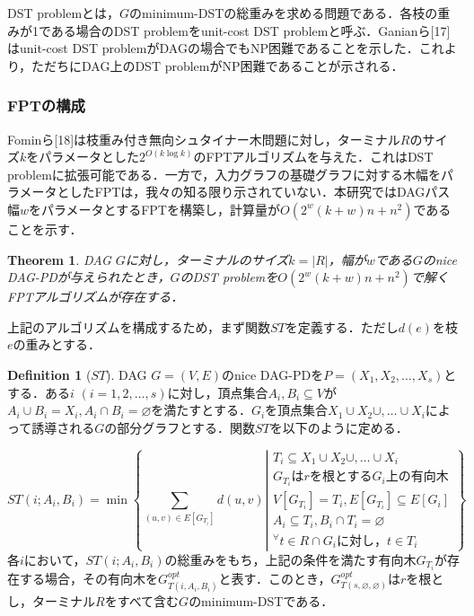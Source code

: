 \documentclass[master]{kuisthesis}		%
\theoremstyle{plain}
\newtheorem{theorem}{Theorem}
\theoremstyle{definition}
\newtheorem{definition*}{Definition}
\begin{document}
DST problemとは，$G$のminimum-DSTの総重みを求める問題である．各枝の重みが1である場合のDST problemをunit-cost DST problemと呼ぶ．Ganianら[17]はunit-cost DST problemがDAGの場合でもNP困難であることを示した．これより，ただちにDAG上のDST problemがNP困難であることが示される．

\subsubsection{FPTの構成}
Fominら[18]は枝重み付き無向シュタイナー木問題に対し，ターミナル$R$のサイズ$k$をパラメータとした$2^{O(k\log k)}$のFPTアルゴリズムを与えた．これはDST problemに拡張可能である．一方で，入力グラフの基礎グラフに対する木幅をパラメータとしたFPTは，我々の知る限り示されていない．本研究ではDAGパス幅$w$をパラメータとするFPTを構築し，計算量が$O(2^w(k+w)n + n^2)$であることを示す．

\begin{theorem}
    DAG $G$に対し，ターミナルのサイズ$k=|R|$，幅が$w$である$G$のnice DAG-PDが与えられたとき，$G$のDST problemを$O(2^w(k+w)n + n^2)$で解くFPTアルゴリズムが存在する．
\end{theorem}

上記のアルゴリズムを構成するため，まず関数$ST$を定義する．ただし$d(e)$を枝$e$の重みとする．

\begin{definition*}[$ST$]
    DAG $G=(V, E)$のnice DAG-PDを$P=(X_1, X_2, \dots , X_s)$とする．ある$i$ $(i=1, 2, \dots , s)$に対し，頂点集合$A_i, B_i \subseteq V$が$A_i \cup B_i = X_i, A_i \cap B_i = \varnothing$を満たすとする．$G_i$を頂点集合$X_1 \cup X_2 \cup,  \dots \cup X_i$によって誘導される$G$の部分グラフとする．関数$ST$を以下のように定める．

    \begin{equation}
        ST(i; A_i, B_i) = \min \left\{ \displaystyle \sum_{(u, v) \in E[G_{T_i}]} d(u, v) \left |
        \begin{array}{l} \label{ST_def}
            T_i \subseteq X_1 \cup X_2 \cup,  \dots \cup X_i\\
            G_{T_i} \text{は$r$を根とする$G_i$上の有向木}\\
            V[G_{T_i}] = T_i,  E[G_{T_i}] \subseteq E[G_i]\\
            A_i \subseteq T_i, B_i \cap T_i = \varnothing \\
            ^{\forall}t \in R \cap G_i \text{に対し，} t \in T_i
        \end{array}
        \right. \right\}
    \end{equation}
    各$i$において，$ST(i; A_i, B_i)$の総重みをもち，上記の条件を満たす有向木$G_{T_i}$が存在する場合，その有向木を$G^{opt}_{T(i, A_i, B_i)}$と表す．このとき，$G^{opt}_{T(s, \varnothing, \varnothing)}$は$r$を根とし，ターミナル$R$をすべて含む$G$のminimum-DSTである．
\end{definition*}
\end{document}
